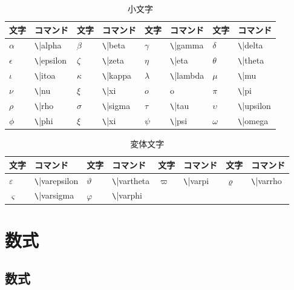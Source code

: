 \documentclass[11pt,a4paper]{jsarticle}
\begin{document}
\begin{table} [ h ]
\caption{小文字}
	\begin{center}
	\begin{tabular}{| l | l || l | l || l | l || l | l |} \hline
		文字 & コマンド & 文字 & コマンド & 文字 & コマンド & 文字 & コマンド \\ \hline
		$\alpha$ & \verb|\|alpha & $\beta$ & \verb|\|beta & $\gamma$ & \verb|\|gamma & $\delta$ & \verb|\|delta \\ \hline
		$\epsilon$ & \verb|\|epsilon & $\zeta$ & \verb|\|zeta & $\eta$ & \verb|\|eta & $\theta$ & \verb|\|theta \\ \hline
		$\iota$ & \verb|\|itoa & $\kappa$ & \verb|\|kappa & $\lambda$ & \verb|\|lambda & $\mu$ & \verb|\|mu \\ \hline
		$\nu$ & \verb|\|nu & $\xi$ & \verb|\|xi & $o$ & o & $\pi$ & \verb|\|pi \\ \hline
		$\rho$ & \verb|\|rho & $\sigma$ & \verb|\|sigma & $\tau$ & \verb|\|tau & $\upsilon$ & \verb|\|upsilon \\ \hline
		$\phi$ & \verb|\|phi & $\xi$ & \verb|\|xi & $\psi$ & \verb|\|psi & $\omega$ & \verb|\|omega \\ \hline
	\end{tabular}
	\end{center}
\end{table}

\begin{table} [ h ]
\caption{変体文字}
	\begin{center}
	\begin{tabular}{| l | l || l | l || l | l || l | l |} \hline
		文字 & コマンド & 文字 & コマンド & 文字 & コマンド & 文字 & コマンド \\ \hline
		$\varepsilon$ & \verb|\|varepsilon & $\vartheta$ & \verb|\|vartheta & $\varpi$ & \verb|\|varpi & $\varrho$ & \verb|\|varrho \\ \hline
		$\varsigma$ & \verb|\|varsigma & $\varphi$ & \verb|\|varphi &  &  &  & \\ \hline
	\end{tabular}
	\end{center}
\end{table}


\section{数式}

\subsection{数式}
\end{document}
